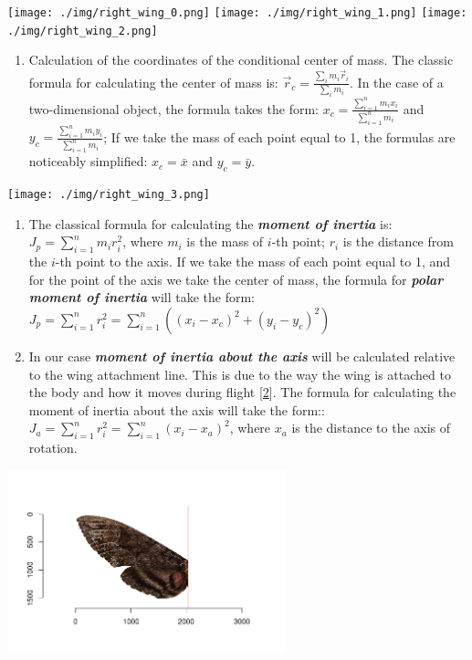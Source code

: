 \documentclass[
]{article}
\providecommand{\tightlist}{%
  \setlength{\itemsep}{0pt}\setlength{\parskip}{0pt}}
\begin{document}
\texttt{[image: ./img/right\_wing\_0.png]}
\texttt{[image: ./img/right\_wing\_1.png]}
\texttt{[image: ./img/right\_wing\_2.png]}

\begin{enumerate}
\def\labelenumi{\arabic{enumi}.}
\setcounter{enumi}{1}
\tightlist
\item
  Calculation of the coordinates of the conditional center of mass. The
  classic formula for calculating the center of mass is:
  \(\vec r_c= \frac{\sum \limits_i m_i \vec r_i}{\sum \limits_i m_i}\).
  In the case of a two-dimensional object, the formula takes the form:
  \(x_c = \frac{\sum_{i=1}^{n} m_i x_i}{\sum_{i=1}^{n} m_i}\) and
  \(y_c = \frac{\sum_{i=1}^{n} m_i y_i}{\sum_{i=1}^{n} m_i}\); If we
  take the mass of each point equal to 1, the formulas are noticeably
  simplified: \(x_c = \bar{x}\) and \(y_c = \bar{y}\).
\end{enumerate}

\texttt{[image: ./img/right\_wing\_3.png]}

\begin{enumerate}
\def\labelenumi{\arabic{enumi}.}
\setcounter{enumi}{2}
\item
  The classical formula for calculating the \textbf{\emph{moment of
  inertia}} is: \(J_p = \sum_{i=1}^n m_i r_i^2\), where \(m_i\) is the
  mass of \(i\)-th point; \(r_i\) is the distance from the \(i\)-th
  point to the axis. If we take the mass of each point equal to 1, and
  for the point of the axis we take the center of mass, the formula for
  \textbf{\emph{polar moment of inertia}} will take the form:
  \(J_p = \sum_{i=1}^n r_i^2 = \sum_{i=1}^n ((x_i-x_c)^2 + (y_i-y_c)^2)\)
\item
  In our case \textbf{\emph{moment of inertia about the axis}} will be
  calculated relative to the wing attachment line. This is due to the
  way the wing is attached to the body and how it moves during flight
  {[}\protect\hyperlink{ref-Insect-flight}{2}{]}. The formula for
  calculating the moment of inertia about the axis will take the form::
  \(J_a = \sum_{i=1}^n r_i^2 = \sum_{i=1}^n (x_i-x_a)^2\), where \(x_a\)
  is the distance to the axis of rotation.
\end{enumerate}

\includegraphics[width=\textwidth,height=2.08333in]{./img/Moment_of_inertia_about_the_axis.png}
\end{document}
